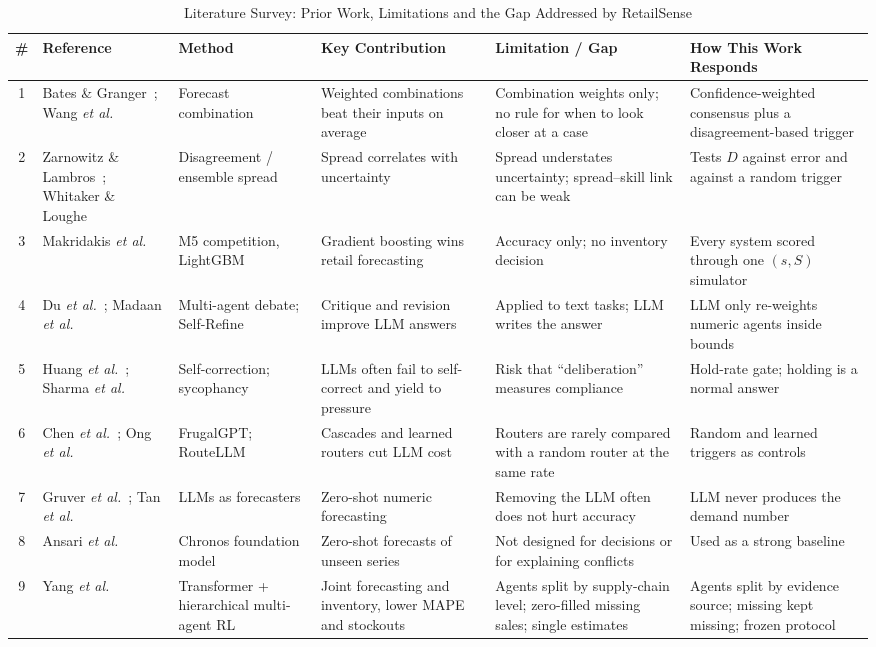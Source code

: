 \documentclass[conference]{IEEEtran}
\begin{document}
\begin{table}[!t]
\centering
\caption{Literature Survey: Prior Work, Limitations and the Gap Addressed by RetailSense}
\label{tab:literature}
\footnotesize
\renewcommand{\arraystretch}{1.15}
\begin{tabularx}{\textwidth}{|c|p{2.2cm}|p{2.6cm}|X|X|X|}
\hline
\textbf{\#} & \textbf{Reference} & \textbf{Method} & \textbf{Key Contribution} &
\textbf{Limitation / Gap} & \textbf{How This Work Responds} \\
\hline
1 & Bates \& Granger~\cite{bates1969}; Wang \emph{et al.}~\cite{wang2023} & Forecast combination &
Weighted combinations beat their inputs on average & Combination weights only; no rule for when to
look closer at a case & Confidence-weighted consensus plus a disagreement-based trigger \\
\hline
2 & Zarnowitz \& Lambros~\cite{zarnowitz1987}; Whitaker \& Loughe~\cite{whitaker1998} &
Disagreement / ensemble spread & Spread correlates with uncertainty & Spread understates
uncertainty; spread--skill link can be weak & Tests $D$ against error and against a random trigger \\
\hline
3 & Makridakis \emph{et al.}~\cite{makridakis2022} & M5 competition, LightGBM & Gradient boosting
wins retail forecasting & Accuracy only; no inventory decision & Every system scored through one
$(s,S)$ simulator \\
\hline
4 & Du \emph{et al.}~\cite{du2024}; Madaan \emph{et al.}~\cite{madaan2023} & Multi-agent debate;
Self-Refine & Critique and revision improve LLM answers & Applied to text tasks; LLM writes the
answer & LLM only re-weights numeric agents inside bounds \\
\hline
5 & Huang \emph{et al.}~\cite{huang2024}; Sharma \emph{et al.}~\cite{sharma2024} & Self-correction;
sycophancy & LLMs often fail to self-correct and yield to pressure & Risk that ``deliberation''
measures compliance & Hold-rate gate; holding is a normal answer \\
\hline
6 & Chen \emph{et al.}~\cite{chen2023}; Ong \emph{et al.}~\cite{ong2025} & FrugalGPT; RouteLLM &
Cascades and learned routers cut LLM cost & Routers are rarely compared with a random router at the
same rate & Random and learned triggers as controls \\
\hline
7 & Gruver \emph{et al.}~\cite{gruver2023}; Tan \emph{et al.}~\cite{tan2024} & LLMs as forecasters &
Zero-shot numeric forecasting & Removing the LLM often does not hurt accuracy & LLM never produces
the demand number \\
\hline
8 & Ansari \emph{et al.}~\cite{ansari2024} & Chronos foundation model & Zero-shot forecasts of unseen
series & Not designed for decisions or for explaining conflicts & Used as a strong baseline \\
\hline
9 & Yang \emph{et al.}~\cite{yang2025} & Transformer + hierarchical multi-agent RL & Joint forecasting
and inventory, lower MAPE and stockouts & Agents split by supply-chain level; zero-filled missing
sales; single estimates & Agents split by evidence source; missing kept missing; frozen protocol \\
\hline
\end{tabularx}
\end{table}
\end{document}
